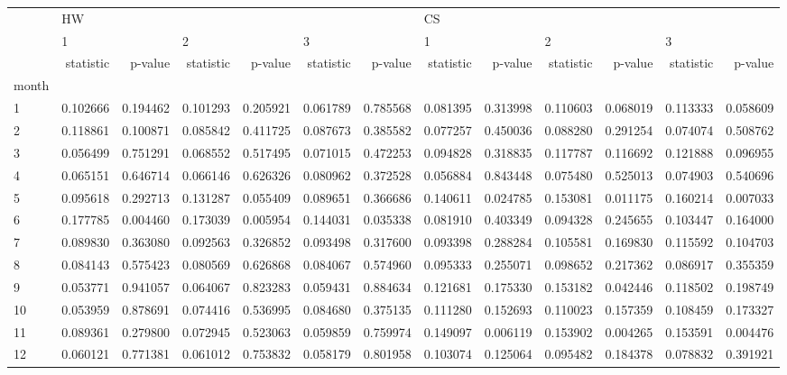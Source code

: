 \begin{tabular}{lrrrrrrrrrrrr}
\toprule
{} & \multicolumn{6}{l}{HW} & \multicolumn{6}{l}{CS} \\
{} & \multicolumn{2}{l}{1} & \multicolumn{2}{l}{2} & \multicolumn{2}{l}{3} & \multicolumn{2}{l}{1} & \multicolumn{2}{l}{2} & \multicolumn{2}{l}{3} \\
{} & statistic &   p-value & statistic &   p-value & statistic &   p-value & statistic &   p-value & statistic &   p-value & statistic &   p-value \\
month &           &           &           &           &           &           &           &           &           &           &           &           \\
\midrule
1     &  0.102666 &  0.194462 &  0.101293 &  0.205921 &  0.061789 &  0.785568 &  0.081395 &  0.313998 &  0.110603 &  0.068019 &  0.113333 &  0.058609 \\
2     &  0.118861 &  0.100871 &  0.085842 &  0.411725 &  0.087673 &  0.385582 &  0.077257 &  0.450036 &  0.088280 &  0.291254 &  0.074074 &  0.508762 \\
3     &  0.056499 &  0.751291 &  0.068552 &  0.517495 &  0.071015 &  0.472253 &  0.094828 &  0.318835 &  0.117787 &  0.116692 &  0.121888 &  0.096955 \\
4     &  0.065151 &  0.646714 &  0.066146 &  0.626326 &  0.080962 &  0.372528 &  0.056884 &  0.843448 &  0.075480 &  0.525013 &  0.074903 &  0.540696 \\
5     &  0.095618 &  0.292713 &  0.131287 &  0.055409 &  0.089651 &  0.366686 &  0.140611 &  0.024785 &  0.153081 &  0.011175 &  0.160214 &  0.007033 \\
6     &  0.177785 &  0.004460 &  0.173039 &  0.005954 &  0.144031 &  0.035338 &  0.081910 &  0.403349 &  0.094328 &  0.245655 &  0.103447 &  0.164000 \\
7     &  0.089830 &  0.363080 &  0.092563 &  0.326852 &  0.093498 &  0.317600 &  0.093398 &  0.288284 &  0.105581 &  0.169830 &  0.115592 &  0.104703 \\
8     &  0.084143 &  0.575423 &  0.080569 &  0.626868 &  0.084067 &  0.574960 &  0.095333 &  0.255071 &  0.098652 &  0.217362 &  0.086917 &  0.355359 \\
9     &  0.053771 &  0.941057 &  0.064067 &  0.823283 &  0.059431 &  0.884634 &  0.121681 &  0.175330 &  0.153182 &  0.042446 &  0.118502 &  0.198749 \\
10    &  0.053959 &  0.878691 &  0.074416 &  0.536995 &  0.084680 &  0.375135 &  0.111280 &  0.152693 &  0.110023 &  0.157359 &  0.108459 &  0.173327 \\
11    &  0.089361 &  0.279800 &  0.072945 &  0.523063 &  0.059859 &  0.759974 &  0.149097 &  0.006119 &  0.153902 &  0.004265 &  0.153591 &  0.004476 \\
12    &  0.060121 &  0.771381 &  0.061012 &  0.753832 &  0.058179 &  0.801958 &  0.103074 &  0.125064 &  0.095482 &  0.184378 &  0.078832 &  0.391921 \\
\bottomrule
\end{tabular}
